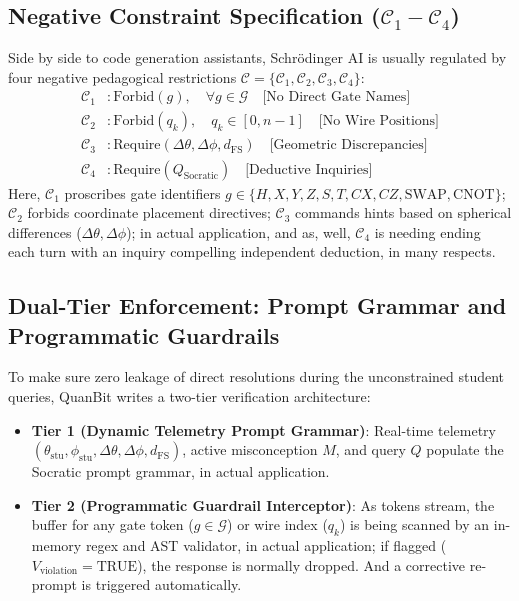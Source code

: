 \documentclass[conference]{IEEEtran}
\begin{document}
\subsection{Negative Constraint Specification ($\mathcal{C}_1-\mathcal{C}_4$)}
Side by side to code generation assistants, Schr{\"o}dinger AI is usually regulated by four negative pedagogical restrictions $\mathcal{C} = \{\mathcal{C}_1, \mathcal{C}_2, \mathcal{C}_3, \mathcal{C}_4\}$:
\begin{equation}
\label{eq:ai_rules}
\begin{aligned}
\mathcal{C}_1 &: \text{Forbid}(g), \quad \forall g \in \mathcal{G} \quad \text{[No Direct Gate Names]} \\
\mathcal{C}_2 &: \text{Forbid}(q_k), \quad q_k \in [0, n-1] \quad \text{[No Wire Positions]} \\
\mathcal{C}_3 &: \text{Require}(\Delta\theta, \Delta\phi, d_{\text{FS}}) \quad \text{[Geometric Discrepancies]} \\
\mathcal{C}_4 &: \text{Require}(Q_{\text{Socratic}}) \quad \text{[Deductive Inquiries]}
\end{aligned}
\end{equation}
Here, $\mathcal{C}_1$ proscribes gate identifiers $g \in \{H, X, Y, Z, S, T, CX, CZ, \text{SWAP}, \text{CNOT}\}$; $\mathcal{C}_2$ forbids coordinate placement directives; $\mathcal{C}_3$ commands hints based on spherical differences ($\Delta\theta, \Delta\phi$); in actual application, and as, well, $\mathcal{C}_4$ is needing ending each turn with an inquiry compelling independent deduction, in many respects.

\subsection{Dual-Tier Enforcement: Prompt Grammar and Programmatic Guardrails}
To make sure zero leakage of direct resolutions during the unconstrained student queries, QuanBit writes a two-tier verification architecture:
\begin{itemize}[leftmargin=*,noitemsep,topsep=1pt]
    \item \textbf{Tier 1 (Dynamic Telemetry Prompt Grammar)}: Real-time telemetry $(\theta_{\text{stu}}, \phi_{\text{stu}}, \Delta\theta, \Delta\phi, d_{\text{FS}})$, active misconception $M$, and query $Q$ populate the Socratic prompt grammar, in actual application.
    \item \textbf{Tier 2 (Programmatic Guardrail Interceptor)}: As tokens stream, the buffer for any gate token ($g \in \mathcal{G}$) or wire index ($q_k$) is being scanned by an in-memory regex and AST validator, in actual application; if flagged ($V_{\text{violation}} = \text{TRUE}$), the response is normally dropped. And a corrective re-prompt is triggered automatically.
\end{itemize}
\end{document}

